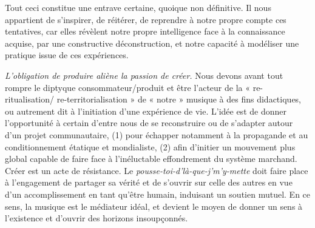 \documentclass{article}
\begin{document}
Tout ceci constitue une entrave certaine, quoique non définitive. Il nous appartient de s’inspirer, de réitérer, de reprendre à notre propre compte ces tentatives, car elles révèlent notre propre intelligence face à la connaissance acquise, par une constructive déconstruction, et notre capacité à modéliser une pratique issue de ces expériences.

\bigskip

\textit{L’obligation de produire aliène la passion de créer. 
}%
Nous devons avant tout rompre le diptyque consommateur/produit et être l'acteur de la « re-ritualisation/ re-territorialisation » de « notre » musique à des fins didactiques, ou autrement dit à l'initiation d'une expérience de vie.
%
L’idée est de donner l’opportunité à certain d’entre nous de se reconstruire ou de s’adapter autour d’un projet communautaire, (1) pour échapper notamment à la propagande et au conditionnement étatique et mondialiste, (2) afin d’initier un mouvement plus global capable de faire face à l’inéluctable effondrement du système marchand. Créer est un acte de résistance. Le \textit{pousse-toi-d'là-que-j'm'y-mette} doit faire place à l'engagement de partager sa vérité et de s'ouvrir sur celle des autres en vue d'un accomplissement en tant qu'être humain, induisant un soutien mutuel. En ce sens, la musique est le médiateur idéal, et devient le moyen de donner un sens à l’existence et d'ouvrir des horizons insoupçonnés. 

\bigskip
\end{document}
